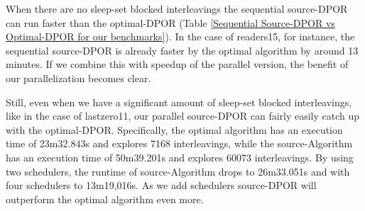 When there are no sleep-set blocked interleavings the sequential source-DPOR
can run faster than the optimal-DPOR (Table \ref{Sequential Source-DPOR vs Optimal-DPOR for our benchmarks}). 
In the case of readers15, for instance, the sequential source-DPOR is already faster by the optimal algorithm by
around 13 minutes. If we combine this with speedup of the parallel version, the benefit of our parallelization becomes clear.

Still, even when we have a significant amount of sleep-set blocked interleavings, like in the case of lastzero11, our parallel
source-DPOR can fairly easily catch up with the optimal-DPOR. Specifically, the optimal algorithm has an execution time of 23m32.843s
and explores 7168 interleavings, while the source-Algorithm has an execution time of 50m39.201s and explores 60073 interleavings.
By using two schedulers, the runtime of source-Algorithm drops to 26m33.051s and with four schedulers to 13m19,016s. As we add
schedulers source-DPOR will outperform the optimal algorithm even more.

